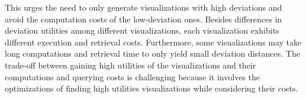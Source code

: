 This urges the need to only generate visualizations with high deviations and avoid the computation costs of the low-deviation ones.
%
Besides differences in deviation utilities among different visualizations, each visualization exhibits different execution and retrieval costs.
%
%
Furthermore, some visualizations may take long computations and retrieval time to only yield small deviation distances. 
%
The trade-off between gaining high utilities of the visualizations and their computations and querying costs is challenging because 
it involves the optimizations of finding high utilities visualizations while considering their costs.






